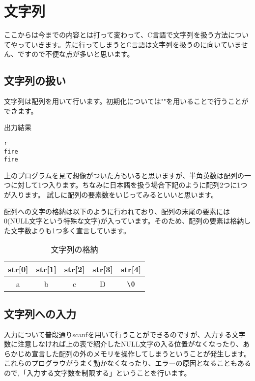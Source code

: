 ﻿\section{文字列}
ここからは今までの内容とは打って変わって、C言語で文字列を扱う方法についてやっていきます。先に行ってしまうとC言語は文字列を扱うのに向いていません、ですので不便な点が多いと思います。

\subsection{文字列の扱い}
文字列は配列を用いて行います。初期化については""を用いることで行うことができます。



\begin{itembox}{出力結果}
\begin{verbatim}
r
fire
fire
\end{verbatim}
\end{itembox}
上のプログラムを見て想像がついた方もいると思いますが、半角英数は配列の一つに対して1つ入ります。ちなみに日本語を扱う場合下記のように配列2つに1つが入ります。
試しに配列の要素数をいじってみるといいと思います。




配列への文字の格納は以下のように行われており、配列の末尾の要素には\\0(NULL文字という特殊な文字)が入っています。そのため、配列の要素は格納した文字数よりも1つ多く宣言しています。

\begin{table}[htb]
\begin{center}
\begin{tabular}{|c|c|c|c|c|}
\hline
str[0] & str[1]& str[2] &str[3]&str[4] \\ \hline
 a&b &c &D &\verb|\0|  \\ \hline


\end{tabular}
\caption{ 文字列の格納}
\end{center}
\end{table}

\subsection{文字列への入力}
入力について普段通りscanfを用いて行うことができるのですが、入力する文字数に注意しなければ上の表で紹介したNULL文字の入る位置がなくなったり、あらかじめ宣言した配列の外のメモリを操作してしまうということが発生します。これらのプログラウがうまく動かなくなったり、エラーの原因となることもあるので,「入力する文字数を制限する」ということを行います。

